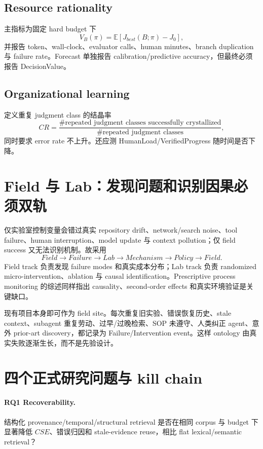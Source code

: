 \documentclass[11pt,a4paper]{ctexart}
\newcommand{\E}{\mathbb{E}}
\begin{document}
\subsection{Resource rationality}
主指标为固定 hard budget 下
\begin{equation}
V_B(\pi)=\E[J_{best}(B;\pi)-J_0],
\end{equation}
并报告 token、wall-clock、evaluator calls、human minutes、branch duplication 与 failure rate。Forecast 单独报告 calibration/predictive accuracy，但最终必须报告 DecisionValue。

\subsection{Organizational learning}
定义重复 judgment class 的结晶率
\begin{equation}
CR=\frac{\#\text{repeated judgment classes successfully crystallized}}{\#\text{repeated judgment classes}},
\end{equation}
同时要求 error rate 不上升。还应测 HumanLoad/VerifiedProgress 随时间是否下降。

\section{Field 与 Lab：发现问题和识别因果必须双轨}

仅实验室控制变量会错过真实 repository drift、network/search noise、tool failure、human interruption、model update 与 context pollution；仅 field success 又无法识别机制。故采用
\begin{equation}
\boxed{Field\to Failure\to Lab\to Mechanism\to Policy\to Field.}
\end{equation}
Field track 负责发现 failure modes 和真实成本分布；Lab track 负责 randomized micro-intervention、ablation 与 causal identification。Prescriptive process monitoring 的综述同样指出 causality、second-order effects 和真实环境验证是关键缺口\cite{fertig2026ppm}。

现有项目本身即可作为 field site。每次重复旧实验、错误恢复历史、stale context、subagent 重复劳动、过早/过晚检索、SOP 未遵守、人类纠正 agent、意外 prior-art discovery，都记录为 Failure/Intervention event。这样 ontology 由真实失败逐渐生长，而不是先验设计。

\section{四个正式研究问题与 kill chain}

\paragraph{RQ1 Recoverability.}
结构化 provenance/temporal/structural retrieval 是否在相同 corpus 与 budget 下显著降低 $CSE$、错误归因和 stale-evidence reuse，相比 flat lexical/semantic retrieval？
\end{document}
